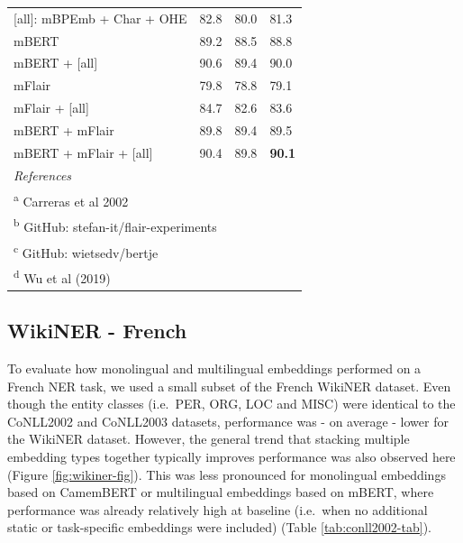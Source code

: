 \documentclass[12pt,a4paper,]{book}
\begin{document}
\begin{table}
\begin{tabular}[t]{llll}
\hspace{1em}[all]: mBPEmb + Char + OHE & 82.8 & 80.0 & 81.3\\
\hspace{1em}mBERT & 89.2 & 88.5 & 88.8\\
\hspace{1em}mBERT + [all] & 90.6 & 89.4 & 90.0\\
\hspace{1em}mFlair & 79.8 & 78.8 & 79.1\\
\hspace{1em}mFlair + [all] & 84.7 & 82.6 & 83.6\\
\hspace{1em}mBERT + mFlair & 89.8 & 89.4 & 89.5\\
\hspace{1em}mBERT + mFlair + [all] & 90.4 & 89.8 & \textbf{90.1}\\
\bottomrule
\multicolumn{4}{l}{\textit{References}}\\
\multicolumn{4}{l}{\textsuperscript{a} Carreras et al 2002}\\
\multicolumn{4}{l}{\textsuperscript{b} GitHub: stefan-it/flair-experiments}\\
\multicolumn{4}{l}{\textsuperscript{c} GitHub: wietsedv/bertje}\\
\multicolumn{4}{l}{\textsuperscript{d} Wu et al (2019)}\\
\end{tabular}
\end{table}



\hypertarget{wikiner---french}{%
\subsection{WikiNER - French}\label{wikiner---french}}

To evaluate how monolingual and multilingual embeddings performed on a French NER task, we used a small subset of the French WikiNER dataset. Even though the entity classes (i.e.~PER, ORG, LOC and MISC) were identical to the CoNLL2002 and CoNLL2003 datasets, performance was - on average - lower for the WikiNER dataset. However, the general trend that stacking multiple embedding types together typically improves performance was also observed here (Figure \ref{fig:wikiner-fig}). This was less pronounced for monolingual embeddings based on CamemBERT or multilingual embeddings based on mBERT, where performance was already relatively high at baseline (i.e.~when no additional static or task-specific embeddings were included) (Table \ref{tab:conll2002-tab}).
\end{document}
